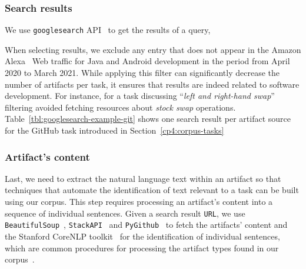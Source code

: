 \subsubsection{Search results}


We use \texttt{googlesearch} API~\cite{googlesearch} to get the results of a query,



When selecting results, we exclude any entry that does not appear in the Amazon Alexa~\cite{alexa} Web traffic for Java and Android development in the period from April 2020 to March 2021. 
While applying this filter can significantly decrease the number of artifacts per task, it ensures that results are indeed related to software development. 
For instance, for a task discussing ``\textit{left and right-hand swap}'' 
filtering avoided fetching resources about  \textit{stock swap} operations.
Table~\ref{tbl:googlesearch-example-git} shows one search result per artifact source for the GitHub task introduced in Section~\ref{cp4:corpus-tasks}







\subsubsection{Artifact's content}

Last, we need to extract the natural language text within an artifact so that 
techniques that automate the identification of text relevant to a task can be built 
using our corpus.  This step requires processing an artifact's content 
into a sequence of individual sentences.
Given a search result \texttt{URL}, we use \texttt{BeautifulSoup}~\cite{beautifulsoup4},
\texttt{StackAPI}~\cite{StackAPI} and \texttt{PyGithub}~\cite{PyGithub}
to fetch the artifacts' content
and the Stanford CoreNLP toolkit~\cite{CoreNLP} for the identification of 
individual sentences,
which are common procedures for processing the artifact types found in our corpus~\cite{Arya2019, nadi2020}.










